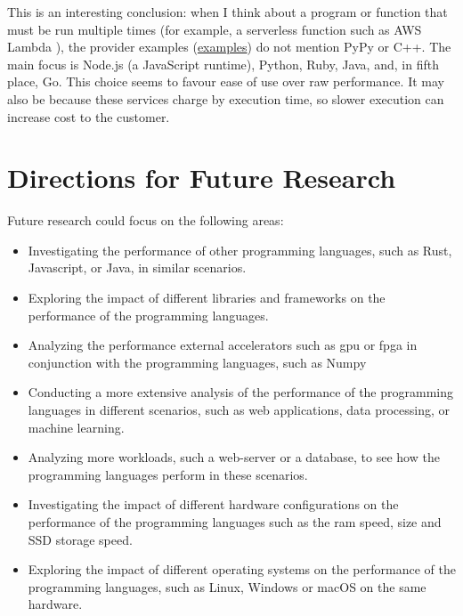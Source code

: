 This is an interesting conclusion: when I think about a program or function that must be run multiple times (for example, a serverless function such as AWS Lambda \cite{aws:lambda}), the provider examples (\href{https://docs.aws.amazon.com/lambda/latest/dg/lambda-samples.html}{examples}) do not mention PyPy or C++. The main focus is Node.js (a JavaScript runtime), Python, Ruby, Java, and, in fifth place, Go. This choice seems to favour ease of use over raw performance. It may also be because these services charge by execution time, so slower execution can increase cost to the customer.

\section{Directions for Future Research}
Future research could focus on the following areas:
\begin{itemize}
    \item Investigating the performance of other programming languages, such as Rust, Javascript, or Java, in similar scenarios.
    \item Exploring the impact of different libraries and frameworks on the performance of the programming languages.
    \item Analyzing the performance external accelerators such as \gls{gpu} or \gls{fpga} in conjunction with the programming languages, such as Numpy
    \item Conducting a more extensive analysis of the performance of the programming languages in different scenarios, such as web applications, data processing, or machine learning.
    \item Analyzing more workloads, such a web-server or a database, to see how the programming languages perform in these scenarios.
    \item Investigating the impact of different hardware configurations on the performance of the programming languages such as the \gls{ram} speed, size and SSD storage speed.
    \item Exploring the impact of different operating systems on the performance of the programming languages, such as Linux, Windows or macOS on the same hardware.
\end{itemize}